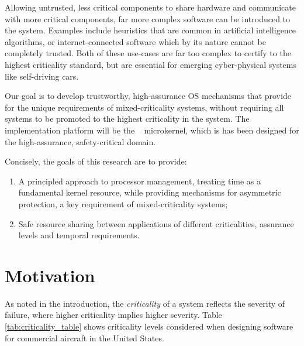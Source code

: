 Allowing untrusted, less critical components to
share hardware and communicate with more critical components, far more complex software can be
introduced to the system. Examples include heuristics that are common in artificial
intelligence algorithms, or internet-connected software which by its nature cannot be completely
trusted. Both of these use-cases are far too complex to certify to the highest criticality standard,
but are essential for emerging cyber-physical systems like self-driving cars. 

Our goal is to develop trustworthy, high-assurance \gls{OS} mechanisms that provide for the unique
requirements of mixed-criticality systems, without requiring all systems to be promoted to the highest
criticality in the system. 
The implementation platform will be the \selfour~\citep{Klein_EHACDEEKNSTW_09}
microkernel, which is has been designed for the high-assurance, safety-critical domain.

Concisely, the goals of this research are to provide:
\begin{enumerate}[label=\textbf{G\arabic*}] 
    \item\label{G1} A principled approach to
    processor management, treating time as a fundamental kernel resource, while
    providing mechanisms for asymmetric protection, a key requirement of mixed-criticality systems;
    \item Safe resource sharing between applications of different criticalities, assurance levels and
    temporal requirements.  
\end{enumerate}

\section{Motivation}

As noted in the introduction, the \emph{criticality} of a system reflects the
severity of failure, where higher criticality implies higher severity.  Table
\ref{tab:criticality_table} shows criticality levels considered when designing
software for commercial aircraft in the United States.

